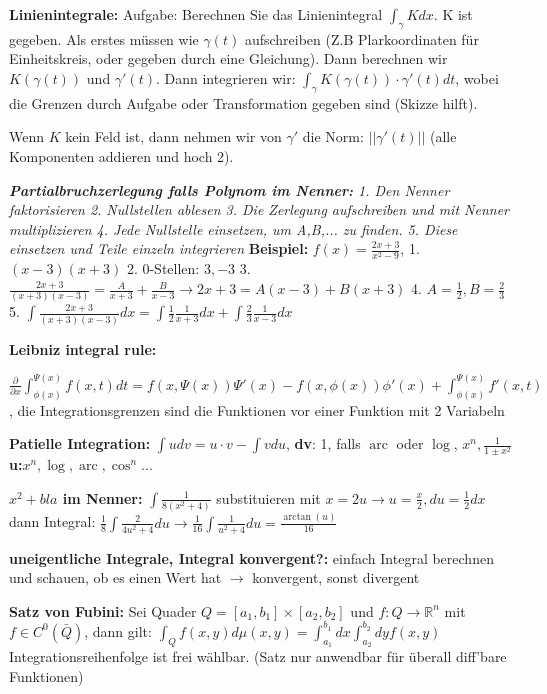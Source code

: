 \documentclass[a3paper, ngerman, 8pt]{article}
\DeclareMathOperator{\arc}{arc}
\begin{document}
\begin{multicols*}{3}
\textbf{Linienintegrale:} Aufgabe: Berechnen Sie das Linienintegral $\int_{\gamma} Kdx$. K ist gegeben. Als erstes müssen wie $\gamma (t)$ aufschreiben (Z.B Plarkoordinaten für Einheitskreis, oder gegeben durch eine Gleichung). Dann berechnen wir $K(\gamma (t))$ und $\gamma ' (t)$. Dann integrieren wir: $\int_{\gamma} K(\gamma (t))\cdot \gamma ' (t)dt$, wobei die Grenzen durch Aufgabe oder Transformation gegeben sind (Skizze hilft).

Wenn $K$ kein Feld ist, dann nehmen wir von $\gamma '$ die Norm: $\vert \vert \gamma ' (t)\vert \vert$ (alle Komponenten addieren und hoch 2).

\textit{\textbf{Partialbruchzerlegung falls Polynom im Nenner:} 1. Den Nenner faktorisieren 2. Nullstellen ablesen 3. Die Zerlegung aufschreiben und mit Nenner multiplizieren 4. Jede Nullstelle einsetzen, um A,B,... zu finden. 5. Diese einsetzen und Teile einzeln integrieren}
\textbf{Beispiel: }$f(x)=\frac{2x+3}{x^2-9}$, 1. $(x-3)(x+3)$ 2. 0-Stellen: $3, -3$ 3. $\frac{2x+3}{(x+3)(x-3)}=\frac{A}{x+3}+ \frac{B}{x-3} \to 2x+3=A(x-3)+B(x+3)$ 4. $A=\frac{1}{2}, B=\frac{2}{3}$ 5. $\int\frac{2x+3}{(x+3)(x-3)}dx=\int\frac{1}{2}\frac{1}{x+3}dx+ \int\frac{2}{3}\frac{1}{x-3}dx$

\textbf{Leibniz integral rule:} 

$\frac{\partial}{\partial x}\int_{\phi (x)}^{\Psi (x)}f(x,t)dt= f(x, \Psi(x))\Psi'(x)-f(x, \phi (x))\phi'(x)+\int_{\phi (x)}^{\Psi(x)}f'(x, t)$, die Integrationsgrenzen sind die Funktionen vor einer Funktion mit 2 Variabeln

\textbf{Patielle Integration:} $\int u dv=u\cdot v -\int v du$, \textbf{dv}: 1,
falls $\arc$ oder $\log$, $x^n, \frac{1}{1\pm x^2}$
\textbf{u:}$x^n, \log, \arc, \cos^n... $


\textbf{$x^2 + bla$ im Nenner:} $\int \frac{1}{8(x^2+4)}$ substituieren mit
$x=2u \to u=\frac{x}{2}, du = \frac{1}{2}dx$ dann Integral: $\frac{1}{8}\int
\frac{2}{4u^2+4}du \to \frac{1}{16} \int \frac{1}{u^2+4}du= \frac{\arctan(u)}{16}$

\textbf{uneigentliche Integrale, Integral konvergent?:} einfach Integral berechnen und schauen, ob es einen Wert hat $\to$ konvergent, sonst divergent

\textbf{Satz von Fubini:} Sei Quader $Q=[a_1, b_1]\times[a_2, b_2]$ und $f: Q \to \mathbb{R}^n$ mit $f \in C^0(\bar{Q})$, dann gilt: $\int_Q f(x,y)d\mu (x, y)= \int_{a_1}^{b_1}dx\int_{a_2}^{b_2}dy f(x,y)$ Integrationsreihenfolge ist frei wählbar. (Satz nur anwendbar für überall diff'bare Funktionen)


\end{multicols*}
\end{document}

